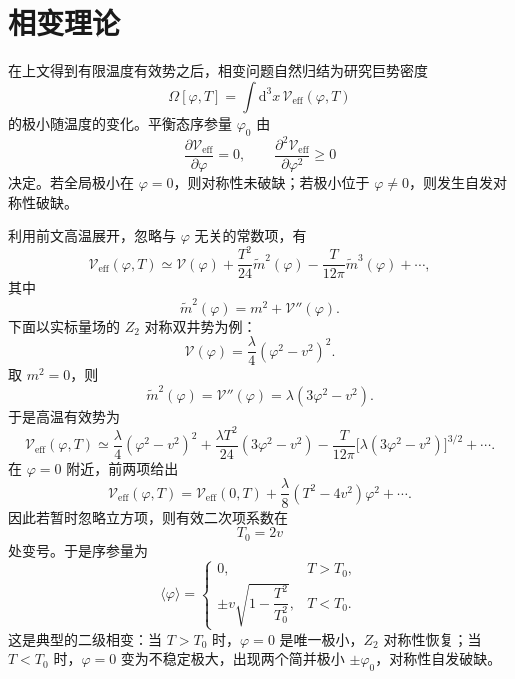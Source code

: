 \section{相变理论}

在上文得到有限温度有效势之后，相变问题自然归结为研究巨势密度
\begin{equation}
\Omega[\varphi,T]=\int \mathrm d^3x\,\mathscr V_{\mathrm{eff}}(\varphi,T)
\end{equation}
的极小随温度的变化。平衡态序参量 \(\varphi_0\) 由
\begin{equation}
\frac{\partial \mathscr V_{\mathrm{eff}}}{\partial \varphi}=0,\qquad
\frac{\partial^2 \mathscr V_{\mathrm{eff}}}{\partial \varphi^2}\ge 0
\end{equation}
决定。若全局极小在 \(\varphi=0\)，则对称性未破缺；若极小位于 \(\varphi\neq0\)，则发生自发对称性破缺。

利用前文高温展开，忽略与 \(\varphi\) 无关的常数项，有
\begin{equation}
\mathscr V_{\mathrm{eff}}(\varphi,T)
\simeq \mathscr V(\varphi)
+\frac{T^2}{24}\tilde m^2(\varphi)
-\frac{T}{12\pi}\tilde m^3(\varphi)+\cdots,
\end{equation}
其中
\begin{equation}
\tilde m^2(\varphi)=m^2+\mathscr V''(\varphi).
\end{equation}
下面以实标量场的 \(Z_2\) 对称双井势为例：
\begin{equation}
\mathscr V(\varphi)=\frac{\lambda}{4}(\varphi^2-v^2)^2.
\end{equation}
取 \(m^2=0\)，则
\begin{equation}
\tilde m^2(\varphi)=\mathscr V''(\varphi)=\lambda(3\varphi^2-v^2).
\end{equation}
于是高温有效势为
\begin{equation}
\mathscr V_{\mathrm{eff}}(\varphi,T)
\simeq
\frac{\lambda}{4}(\varphi^2-v^2)^2
+\frac{\lambda T^2}{24}(3\varphi^2-v^2)
-\frac{T}{12\pi}\big[\lambda(3\varphi^2-v^2)\big]^{3/2}
+\cdots .
\end{equation}
在 \(\varphi=0\) 附近，前两项给出
\begin{equation}
\mathscr V_{\mathrm{eff}}(\varphi,T)
=
\mathscr V_{\mathrm{eff}}(0,T)
+\frac{\lambda}{8}(T^2-4v^2)\varphi^2
+\cdots .
\end{equation}
因此若暂时忽略立方项，则有效二次项系数在
\begin{equation}
T_0=2v
\end{equation}
处变号。于是序参量为
\begin{equation}
\langle\varphi\rangle=
\begin{cases}
0, & T>T_0,\\[4pt]
\pm v\sqrt{1-\dfrac{T^2}{T_0^2}}, & T<T_0.
\end{cases}
\end{equation}
这是典型的二级相变：当 \(T>T_0\) 时，\(\varphi=0\) 是唯一极小，\(Z_2\) 对称性恢复；当 \(T<T_0\) 时，\(\varphi=0\) 变为不稳定极大，出现两个简并极小 \(\pm\varphi_0\)，对称性自发破缺。

